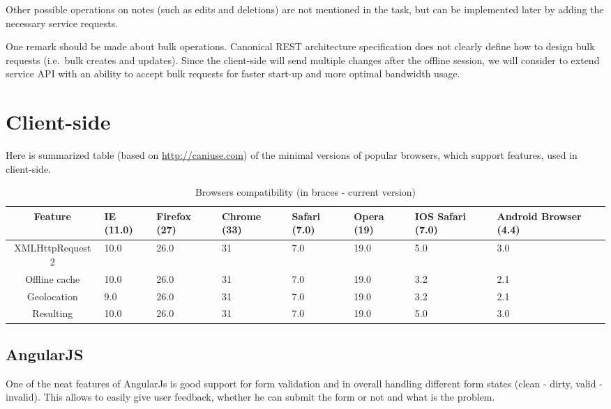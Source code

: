 \documentclass[12pt,a4paper]{article}
\begin{document}
Other possible operations on notes (such as edits and deletions) are
not mentioned in the task, but can be implemented later by adding the
necessary service requests.

One remark should be made about bulk operations. Canonical REST
architecture specification does not clearly define how to design bulk
requests (i.e.\ bulk creates and updates). Since the client-side will
send multiple changes after the offline session, we will consider to
extend service API with an ability to accept bulk requests for faster
start-up and more optimal bandwidth usage.

\section{Client-side}

Here is summarized table (based on \url{http://caniuse.com}) of the minimal
versions of popular browsers, which support features, used in client-side.

\begin{table}[h!]
    \caption{Browsers compatibility (in braces - current version)}
    \begin{tabularx}{\linewidth}{|c|X|X|X|X|X|X|X|}
        \hline
        Feature & IE (11.0) & Firefox (27) & Chrome (33) & Safari (7.0) & Opera (19) & IOS Safari (7.0) & Android Browser (4.4) \\ \hline
        XMLHttpRequest 2 & 10.0 & 26.0 & 31 & 7.0 & 19.0 & 5.0 & 3.0 \\ \hline
        Offline cache    & 10.0 & 26.0 & 31 & 7.0 & 19.0 & 3.2 & 2.1 \\ \hline
        Geolocation      &  9.0 & 26.0 & 31 & 7.0 & 19.0 & 3.2 & 2.1 \\ \hline
        \hline
        Resulting        & 10.0 & 26.0 & 31 & 7.0 & 19.0 & 5.0 & 3.0 \\ \hline
    \end{tabularx}
\end{table}

\subsection{AngularJS}

One of the neat features of AngularJs is good support for form validation and in overall
handling different form states (clean - dirty, valid - invalid). This allows to 
easily give user feedback, whether he can submit the form or not and what is the problem.
\end{document}
